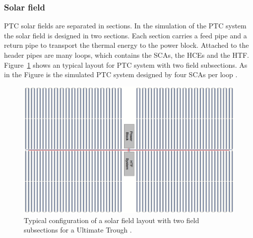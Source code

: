 \subsubsection{Solar field}
PTC solar fields are separated in sections. In the simulation of the PTC system the solar field is designed in two sections. Each section carries a feed pipe and a return pipe to transport the thermal energy to the power block. Attached to the header pipes are many loops, which contains the SCAs, the HCEs and the HTF. Figure~\ref{PTC_Field_ultimate} shows an typical layout for PTC system with two field subsections. As in the Figure is the simulated PTC system designed by four SCAs per loop \cite{Riffelmann2014}.
\begin{figure}[htbp]  
\centering
\includegraphics[width=0.9\linewidth]{FIG/PTC_Field_ultimate}
\caption[Typical configuration of a solar field layout with two field subsections for a Ultimate Trough.]{Typical configuration of a solar field layout with two field subsections for a Ultimate Trough \cite{Riffelmann2014}.}\label{PTC_Field_ultimate}
\end{figure}


